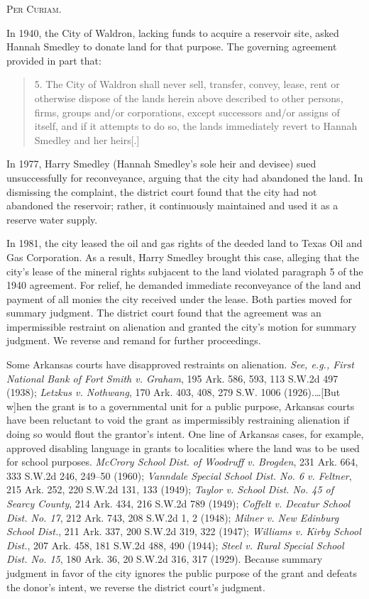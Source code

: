 

\opinion \textsc{Per Curiam}.

In 1940, the City of Waldron, lacking funds to acquire a reservoir site, asked
Hannah Smedley to donate land for that purpose. The governing agreement
provided in part that:
\begin{quote}
5. The City of Waldron shall never sell, transfer, convey, lease, rent or
otherwise dispose of the lands herein above described to other persons, firms,
groups and/or corporations, except successors and/or assigns of itself, and if
it attempts to do so, the lands immediately revert to Hannah Smedley and her
heirs[.]
\end{quote}

In 1977, Harry Smedley (Hannah Smedley's sole heir and devisee) sued
unsuccessfully for reconveyance, arguing that the city had abandoned the land.
In dismissing the complaint, the district court found that the city had not
abandoned the reservoir; rather, it continuously maintained and used it as a
reserve water supply.

In 1981, the city leased the oil and gas rights of the deeded land to Texas Oil
and Gas Corporation. As a result, Harry Smedley brought this case, alleging
that the city's lease of the mineral rights subjacent to the land violated
paragraph 5 of the 1940 agreement. For relief, he demanded immediate
reconveyance of the land and payment of all monies the city received under the
lease. Both parties moved for summary judgment. The district court found that
the agreement was an impermissible restraint on alienation and granted the
city's motion for summary judgment. We reverse and remand for further
proceedings.

Some Arkansas courts have disapproved restraints on alienation. \textit{See,
e.g., First National Bank of Fort Smith v. Graham}, 195 Ark. 586, 593, 113
S.W.2d 497 (1938); \textit{Letzkus v. Nothwang}, 170 Ark. 403, 408, 279 S.W.
1006 (1926).\dots [But w]hen the grant is to a governmental unit for a
public purpose, Arkansas courts have been reluctant to void the grant as
impermissibly restraining alienation if doing so would flout the grantor's
intent. One line of Arkansas cases, for example, approved disabling language in
grants to localities where the land was to be used for school purposes.
\textit{McCrory School Dist. of Woodruff v. Brogden}, 231 Ark. 664, 333 S.W.2d
246, 249--50 (1960); \textit{Vanndale Special School Dist. No. 6 v. Feltner},
215 Ark. 252, 220 S.W.2d 131, 133 (1949); \textit{Taylor v. School Dist. No. 45
of Searcy County}, 214 Ark. 434, 216 S.W.2d 789 (1949); \textit{Coffelt v.
Decatur School Dist. No. 17}, 212 Ark. 743, 208 S.W.2d 1, 2 (1948);
\textit{Milner v. New Edinburg School Dist.}, 211 Ark. 337, 200 S.W.2d 319, 322
(1947); \textit{Williams v. Kirby School Dist.}, 207 Ark. 458, 181 S.W.2d 488,
490 (1944); \textit{Steel v. Rural Special School Dist. No. 15}, 180 Ark. 36,
20 S.W.2d 316, 317 (1929). Because summary judgment in favor of the city
ignores the public purpose of the grant and defeats the donor's intent, we
reverse the district court's judgment.

